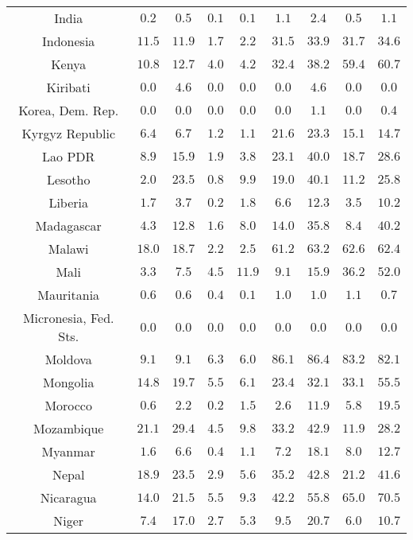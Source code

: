 \begin{longtable}{ccccccccc}
India & $0.2$ & $0.5$ & $0.1$ & $0.1$ & $1.1$ & $2.4$ & $0.5$ & $1.1$ \\ 
Indonesia & $11.5$ & $11.9$ & $1.7$ & $2.2$ & $31.5$ & $33.9$ & $31.7$ & $34.6$ \\ 
Kenya & $10.8$ & $12.7$ & $4.0$ & $4.2$ & $32.4$ & $38.2$ & $59.4$ & $60.7$ \\ 
Kiribati & $0.0$ & $4.6$ & $0.0$ & $0.0$ & $0.0$ & $4.6$ & $0.0$ & $0.0$ \\ 
Korea, Dem. Rep. & $0.0$ & $0.0$ & $0.0$ & $0.0$ & $0.0$ & $1.1$ & $0.0$ & $0.4$ \\ 
Kyrgyz Republic & $6.4$ & $6.7$ & $1.2$ & $1.1$ & $21.6$ & $23.3$ & $15.1$ & $14.7$ \\ 
Lao PDR & $8.9$ & $15.9$ & $1.9$ & $3.8$ & $23.1$ & $40.0$ & $18.7$ & $28.6$ \\ 
Lesotho & $2.0$ & $23.5$ & $0.8$ & $9.9$ & $19.0$ & $40.1$ & $11.2$ & $25.8$ \\ 
Liberia & $1.7$ & $3.7$ & $0.2$ & $1.8$ & $6.6$ & $12.3$ & $3.5$ & $10.2$ \\ 
Madagascar & $4.3$ & $12.8$ & $1.6$ & $8.0$ & $14.0$ & $35.8$ & $8.4$ & $40.2$ \\ 
Malawi & $18.0$ & $18.7$ & $2.2$ & $2.5$ & $61.2$ & $63.2$ & $62.6$ & $62.4$ \\ 
Mali & $3.3$ & $7.5$ & $4.5$ & $11.9$ & $9.1$ & $15.9$ & $36.2$ & $52.0$ \\ 
Mauritania & $0.6$ & $0.6$ & $0.4$ & $0.1$ & $1.0$ & $1.0$ & $1.1$ & $0.7$ \\ 
Micronesia, Fed. Sts. & $0.0$ & $0.0$ & $0.0$ & $0.0$ & $0.0$ & $0.0$ & $0.0$ & $0.0$ \\ 
Moldova & $9.1$ & $9.1$ & $6.3$ & $6.0$ & $86.1$ & $86.4$ & $83.2$ & $82.1$ \\ 
Mongolia & $14.8$ & $19.7$ & $5.5$ & $6.1$ & $23.4$ & $32.1$ & $33.1$ & $55.5$ \\ 
Morocco & $0.6$ & $2.2$ & $0.2$ & $1.5$ & $2.6$ & $11.9$ & $5.8$ & $19.5$ \\ 
Mozambique & $21.1$ & $29.4$ & $4.5$ & $9.8$ & $33.2$ & $42.9$ & $11.9$ & $28.2$ \\ 
Myanmar & $1.6$ & $6.6$ & $0.4$ & $1.1$ & $7.2$ & $18.1$ & $8.0$ & $12.7$ \\ 
Nepal & $18.9$ & $23.5$ & $2.9$ & $5.6$ & $35.2$ & $42.8$ & $21.2$ & $41.6$ \\ 
Nicaragua & $14.0$ & $21.5$ & $5.5$ & $9.3$ & $42.2$ & $55.8$ & $65.0$ & $70.5$ \\ 
Niger & $7.4$ & $17.0$ & $2.7$ & $5.3$ & $9.5$ & $20.7$ & $6.0$ & $10.7$ \\ 

\end{longtable}
